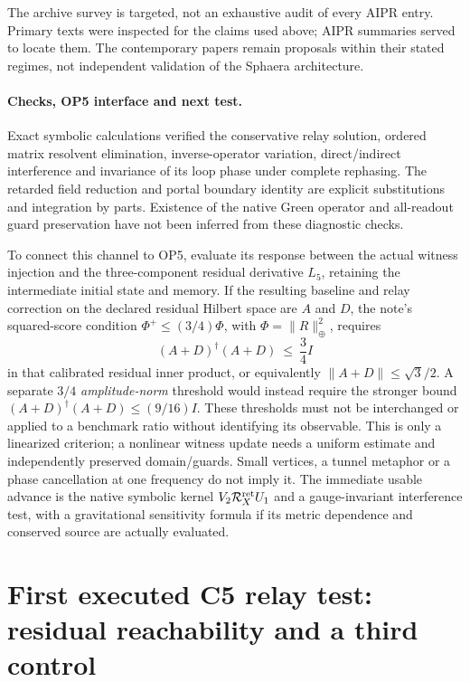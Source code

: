\documentclass[11pt,a4paper]{article}
\begin{document}
The archive survey is targeted, not an exhaustive audit of every
AIPR entry. Primary texts were inspected for the claims used above;
AIPR summaries served to locate them. The contemporary papers
remain proposals within their stated regimes, not independent
validation of the Sphaera architecture.

\paragraph{Checks, OP5 interface and next test.}
Exact symbolic calculations verified the conservative relay solution,
ordered matrix resolvent elimination, inverse-operator variation,
direct/indirect interference and invariance of its loop phase under
complete rephasing. The retarded field reduction and portal boundary
identity are explicit substitutions and integration by parts.
Existence of the native Green operator and all-readout guard
preservation have not been inferred from these diagnostic checks.

To connect this channel to OP5, evaluate its response between the
actual witness injection and the three-component residual derivative
$L_5$, retaining the intermediate initial state and memory. If the
resulting baseline and relay correction on the declared residual
Hilbert space are $A$ and $D$, the note's squared-score condition
$\Phi^+\le(3/4)\Phi$, with $\Phi=\|R\|_\oplus^2$, requires
\[
 (A+D)^\dagger(A+D)\ \le\ \frac34 I
\]
in that calibrated residual inner product, or equivalently
$\|A+D\|\le\sqrt3/2$. A separate $3/4$ \emph{amplitude-norm}
threshold would instead require the stronger bound
$(A+D)^\dagger(A+D)\le(9/16)I$. These thresholds must not be
interchanged or applied to a benchmark ratio without identifying
its observable. This is only a linearized criterion; a nonlinear
witness update needs a uniform estimate and
independently preserved domain/guards. Small vertices, a tunnel
metaphor or a phase cancellation at one frequency do not imply it.
The immediate usable advance is the native symbolic kernel
$V_2\mathcal R_X^{\rm ret}U_1$ and a gauge-invariant interference
test, with a gravitational sensitivity formula if its metric
dependence and conserved source are actually evaluated.

\section{First executed C5 relay test: residual reachability and a third control}
\label{sec:executed-c5-relay-reachability}
\end{document}
